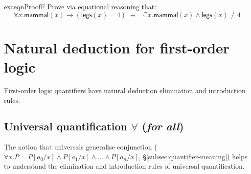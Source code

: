 \vspace{-1em}

\begin{restatable}{exc}{eqnProofF}
  Prove via equational reasoning that:
  \vspace{-0.25em}
\begin{equation*}
  \forall x . \mathsf{mammal}(x) \rightarrow (\mathsf{legs}(x) = 4) \;
  \equiv \; \neg \exists x . \mathsf{mammal}(x) \wedge
  \mathsf{legs}(x)
  \neq 4
\end{equation*}
\end{restatable}
\vspace{-1em}

\section{Natural deduction for first-order logic}

First-order logic quantifiers have natural deduction elimination and introduction rules.

\subsection{Universal quantification $\forall$ (\emph{for all})}

The notion that universals generalise conjunction
($\forall x . P = P[a_0/x] \wedge P[a_1/x] \wedge
\ldots \wedge P[a_{n}/x]$, \S\ref{subsec:quantifier-meaning})
helps to understand the elimination and introduction rules of universal
quantification.

